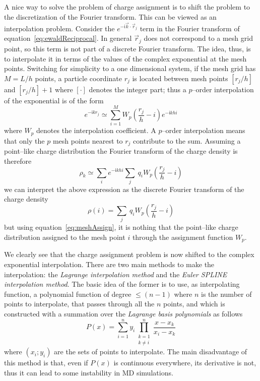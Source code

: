 A nice way to solve the problem of charge assignment is to shift the problem to the discretization of the Fourier
transform. This can be viewed as an interpolation problem. Consider the $e^{-\mathsf{i}\vec k\cdot \vec r_j}$
term in the Fourier transform of equation~\eqref{eq:ewaldReciprocal}. In general $\vec r_j$ does not correspond
to a mesh grid point, so this term is not part of a discrete Fourier transform. The idea, thus, is to interpolate
it in terms of the values of the complex exponential at the mesh points. Switching for simplicity to a one
dimensional system, if the mesh grid has $M = L/h$ points, a particle coordinate $r_j$ is located between mesh
points $[r_j/h]$ and $[r_j/h] + 1$ where $[\cdot]$ denotes the integer part; thus a $p$--order interpolation of
the exponential is of the form
\begin{equation*}
	e^{-\mathsf{i}kr_j} \simeq \sum_{i=1}^M W_{p}\left ( \frac{r_j}{h} - i \right ) e^{-\mathsf{i}khi}
\end{equation*}
where $W_{p}$ denotes the interpolation coefficient. A $p$--order interpolation means that only the $p$ mesh
points nearest to $r_j$ contribute to the sum. Assuming a point--like charge distribution the Fourier transform
of the charge density is therefore
\begin{equation*}
	\rho_k \simeq \sum_{i}e^{-\mathsf{i}khi} \sum_j\ q_iW_{p} \left ( \frac{r_j}{h} - i \right )
\end{equation*}
we can interpret the above expression as the discrete Fourier transform of the charge density
\begin{equation*}
	\rho(i) = \sum_j\ q_iW_{p} \left ( \frac{r_j}{h} - i \right )
\end{equation*}
but using equation~\eqref{eq:meshAssign}, it is nothing that the point--like charge distribution assigned to the
mesh point $i$ through the assignment function $W_{p}$.

We clearly see that the charge assignment problem is now shifted to the complex exponential interpolation. There
are two main methods to make the interpolation: the \textit{Lagrange interpolation method} and the \textit{Euler
SPLINE interpolation method}. The basic idea of the former is to use, as interpolating function, a polynomial
function of degree $ \le (n-1)$ where $n$ is the number of points to interpolate, that passes through all the $n$
points, and which is constructed with a summation over the \textit{Lagrange basis polynomials} as follows
\begin{equation*}
	P(x) = \sum_{i=1}^n y_i \prod_{\substack{k=1\\k\ne i}}^n \frac{x-x_k}{x_i - x_k}
\end{equation*}
where $(x_i;y_i)$ are the sets of points to interpolate. The main disadvantage of this method is that, even if
$P(x)$ is continuous everywhere, its derivative is not, thus it can lead to some instability in \ac{MD}
simulations.


